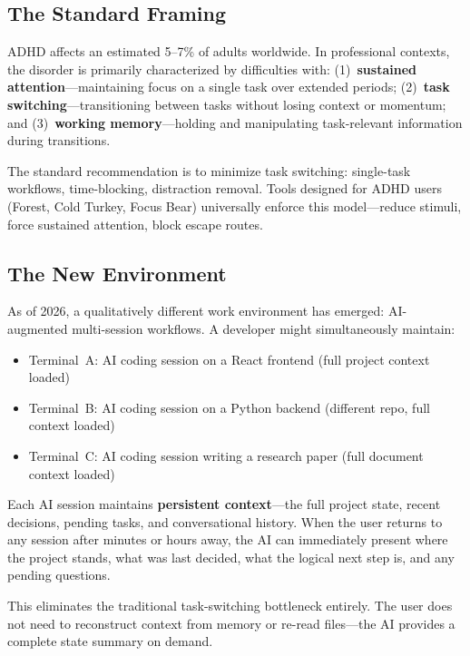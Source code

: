 \documentclass[sigconf,nonacm]{acmart}
\begin{document}
\subsection{The Standard Framing}

ADHD affects an estimated 5--7\% of adults worldwide. In professional contexts, the disorder is primarily characterized by difficulties with: (1)~\textbf{sustained attention}---maintaining focus on a single task over extended periods; (2)~\textbf{task switching}---transitioning between tasks without losing context or momentum; and (3)~\textbf{working memory}---holding and manipulating task-relevant information during transitions.

The standard recommendation is to minimize task switching: single-task workflows, time-blocking, distraction removal. Tools designed for ADHD users (Forest, Cold Turkey, Focus Bear) universally enforce this model---reduce stimuli, force sustained attention, block escape routes.

\subsection{The New Environment}

As of 2026, a qualitatively different work environment has emerged: AI-augmented multi-session workflows. A developer might simultaneously maintain:

\begin{itemize}
  \item Terminal~A: AI coding session on a React frontend (full project context loaded)
  \item Terminal~B: AI coding session on a Python backend (different repo, full context loaded)
  \item Terminal~C: AI coding session writing a research paper (full document context loaded)
\end{itemize}

Each AI session maintains \textbf{persistent context}---the full project state, recent decisions, pending tasks, and conversational history. When the user returns to any session after minutes or hours away, the AI can immediately present where the project stands, what was last decided, what the logical next step is, and any pending questions.

This eliminates the traditional task-switching bottleneck entirely. The user does not need to reconstruct context from memory or re-read files---the AI provides a complete state summary on demand.
\end{document}
